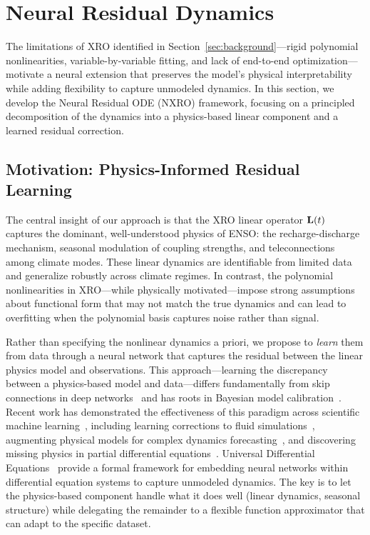 \section{Neural Residual Dynamics}
\label{sec:neural_ode}

The limitations of XRO identified in Section~\ref{sec:background}---rigid polynomial nonlinearities, variable-by-variable fitting, and lack of end-to-end optimization---motivate a neural extension that preserves the model's physical interpretability while adding flexibility to capture unmodeled dynamics. In this section, we develop the Neural Residual ODE (NXRO) framework, focusing on a principled decomposition of the dynamics into a physics-based linear component and a learned residual correction.

\subsection{Motivation: Physics-Informed Residual Learning}

The central insight of our approach is that the XRO linear operator $\mathbf{L}(t)$ captures the dominant, well-understood physics of ENSO: the recharge-discharge mechanism, seasonal modulation of coupling strengths, and teleconnections among climate modes. These linear dynamics are identifiable from limited data and generalize robustly across climate regimes. In contrast, the polynomial nonlinearities in XRO---while physically motivated---impose strong assumptions about functional form that may not match the true dynamics and can lead to overfitting when the polynomial basis captures noise rather than signal.

Rather than specifying the nonlinear dynamics a priori, we propose to \emph{learn} them from data through a neural network that captures the residual between the linear physics model and observations. This approach---learning the discrepancy between a physics-based model and data---differs fundamentally from skip connections in deep networks~\cite{he2016deep} and has roots in Bayesian model calibration~\cite{kennedy2001bayesian}. Recent work has demonstrated the effectiveness of this paradigm across scientific machine learning~\cite{karniadakis2021physics,willard2022integrating}, including learning corrections to fluid simulations~\cite{um2020solver,list2022learned}, augmenting physical models for complex dynamics forecasting~\cite{yin2021augmenting}, and discovering missing physics in partial differential equations~\cite{raissi2019pinn}. Universal Differential Equations~\cite{rackauckas2020universal} provide a formal framework for embedding neural networks within differential equation systems to capture unmodeled dynamics. The key is to let the physics-based component handle what it does well (linear dynamics, seasonal structure) while delegating the remainder to a flexible function approximator that can adapt to the specific dataset.

